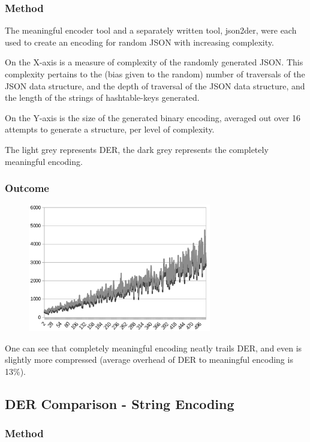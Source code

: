 \subsubsection{Method}

The meaningful encoder tool and a separately written tool, json2der, were
each used to create an encoding for random JSON with increasing complexity.

On the X-axis is a measure of complexity of the randomly generated
JSON. This complexity pertains to the (bias given to the random) number
of traversals of
the JSON data structure, and the
depth of traversal of the JSON data structure, and the length
of the strings of hashtable-keys generated.

On the Y-axis is the size of the generated binary encoding, averaged
out over 16 attempts to generate a structure, per level of complexity.

The light grey represents DER, the dark grey represents the completely
meaningful encoding.

\subsubsection{Outcome}

\begin{figure}[H]
\centering
\includegraphics[width=80mm]{comparison_chart}
\end{figure}

One can see that completely meaningful encoding neatly trails DER, and
even is slightly more compressed (average overhead of DER to meaningful
encoding is 13\%).

\subsection{DER Comparison - String Encoding}

\subsubsection{Method}


